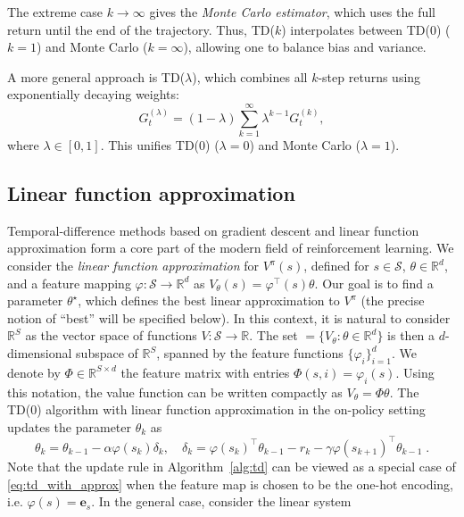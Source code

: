 \documentclass{article}
\numberwithin{equation}{section}
\newcommand{\R}{\mathbb{R}}
\newcommand{\cS}{\mathcal{S}}
\newcommand{\be}{\mathbf{e}}
\newcommand{\eqsp}{\;}
\begin{document}
The extreme case $k \to \infty$ gives the \emph{Monte Carlo estimator}, which uses the full return until the end of the trajectory.
Thus, TD($k$) interpolates between TD(0) ($k=1$) and Monte Carlo ($k=\infty$), allowing one to balance bias and variance. 

A more general approach is TD($\lambda$)\cite{sutton1988tdlambda}, which combines all $k$-step returns using exponentially decaying weights:
\[
    G_t^{(\lambda)} = (1-\lambda) \sum_{k=1}^\infty \lambda^{k-1} G_t^{(k)},
\]
where $\lambda \in [0,1]$. This unifies TD(0) ($\lambda=0$) and Monte Carlo ($\lambda=1$).



\subsection{Linear function approximation}
Temporal-difference methods based on gradient descent and linear function approximation \cite{samsonov2024improved} form a core part of the modern field of reinforcement learning. We consider the \emph{linear function approximation} for $V^{\pi}(s)$, defined for $s \in \cS$, $\theta \in \mathbb{R}^{d}$, and a feature mapping $\varphi :  \cS \to \mathbb{R}^{d}$ as $V_{\theta}^{}(s) =  \varphi^\top(s) \theta$. Our goal is to find a parameter $\theta^\star$, which defines the best linear approximation to $V^{\pi}$ (the precise notion of “best” will be specified below). In this context, it is natural to consider $\mathbb{R}^{S}$ as the vector space of functions $V:\cS \to \mathbb{R}$.  
The set 
\( = \{ V_\theta : \theta \in \mathbb{R}^d \}
\) is then a $d$-dimensional subspace of $\mathbb{R}^{S}$, spanned by the feature functions $\{\varphi_i\}_{i=1}^d$. We denote by \(\Phi\in \R^{S\times d}\) the feature matrix with entries \(\Phi(s,i) = \varphi_i(s)\). Using this notation, the value function can be written compactly as  \(V_\theta = \Phi\theta\). The TD(0) algorithm with linear function approximation  in the on-policy setting updates the parameter $\theta_k$ as
\begin{equation}\label{eq:td_with_approx}
    \theta_{k} = \theta_{k-1} - \alpha \varphi(s_k)  \delta_k,\quad  \delta_k = \varphi(s_k)^\top \theta_{k-1} -  r_k -\gamma\varphi(s_{k+1})^\top \theta_{k-1} \eqsp.
\end{equation}
Note that the update rule in Algorithm~\ref{alg:td} can be viewed as a special case of \eqref{eq:td_with_approx} when the feature map is chosen to be the one-hot encoding, i.e. \(\varphi(s) = \be_s\). In the general case, consider the linear system
\end{document}
